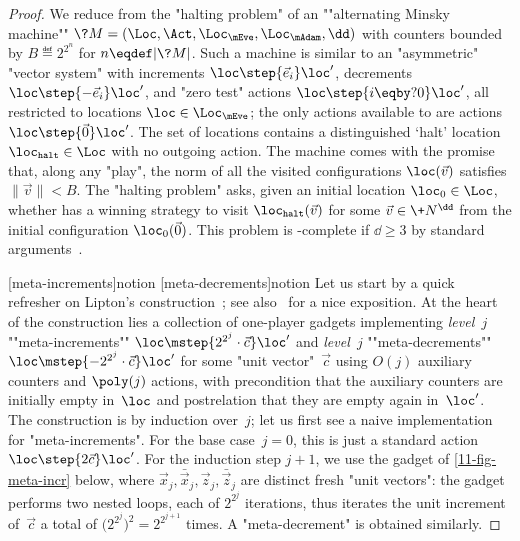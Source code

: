 \begin{proof}
  We reduce from the "halting problem" of an ""alternating Minsky
  machine"" $\?M=(\Loc,\Act,\Loc_\mEve,\Loc_\mAdam,\dd)$ with counters
  bounded by $B\eqdef 2^{2^n}$ for $n\eqdef|\?M|$.  Such a machine is
  similar to an "asymmetric" "vector system" with increments
  $\loc\step{\vec e_i}\loc'$, decrements $\loc\step{-\vec e_i}\loc'$,
  and "zero test" actions $\loc\step{i\eqby?0}\loc'$, all
  restricted to locations $\loc\in\Loc_\mEve$; the only actions
  available to \Adam are actions $\loc\step{\vec 0}\loc'$.  The
  set of locations contains a distinguished `halt' location
  $\loc_\mathtt{halt}\in\Loc$ with no outgoing action.  The
  machine comes with the promise that, along any "play", the norm of
  all the visited configurations $\loc(\vec v)$ satisfies
  $\|\vec v\|<B$.  The "halting problem" asks, given an initial
  location $\loc_0\in\Loc$, whether \Eve has a winning strategy to
  visit $\loc_\mathtt{halt}(\vec v)$ for some $\vec v\in\+N^\dd$ from
  the initial configuration $\loc_0(\vec 0)$.  This problem is
  \kEXP[2]-complete if $\dd\geq 3$ by standard
  arguments~\cite{Fischer&Meyer&Rosenberg:1968}.

    [meta-increments]{notion}
    [meta-decrements]{notion} Let us start
    by a quick refresher on Lipton's construction~\cite{Lipton:1976};
    see also~\cite{Esparza:1996} for a nice exposition.  At the heart
    of the construction lies a collection of one-player gadgets
    implementing \emph{level~$j$} ""meta-increments""
    $\loc\mstep{2^{2^j}\cdot\vec c}\loc'$ and \emph{level~$j$}
    ""meta-decrements"" $\loc\mstep{-2^{2^j}\cdot\vec c}\loc'$ for
    some "unit vector"~$\vec c$ using $O(j)$ auxiliary counters and
    $\poly(j)$ actions, with precondition that the auxiliary counters
    are initially empty in~$\loc$ and postrelation that they are empty
    again in~$\loc'$.  The construction is by induction over~$j$; let
    us first see a naive implementation for "meta-increments".  For
    the base case~$j=0$, this is just a standard action
    $\loc\step{2\vec c}\loc'$.  For the induction step $j+1$, we use
    the gadget of \cref{11-fig-meta-incr} below, where
    $\vec x_{j},\bar{\vec x}_{j},\vec z_{j},\bar{\vec z}_{j}$ are
    distinct fresh "unit vectors": the gadget performs two nested
    loops, each of $2^{2^j}$ iterations, thus iterates the unit
    increment of~$\vec c$ a total of $\big(2^{2^j}\big)^2=2^{2^{j+1}}$
    times.  A "meta-decrement" is obtained similarly.


\end{proof}
